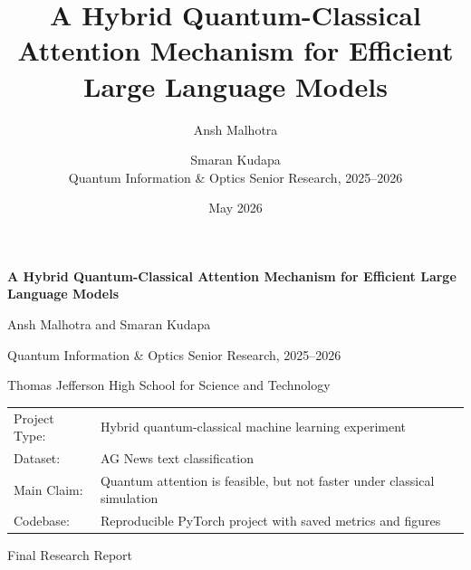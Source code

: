 \documentclass[11pt]{article}
\title{\textbf{A Hybrid Quantum-Classical Attention Mechanism for Efficient Large Language Models}}
\author{Ansh Malhotra \and Smaran Kudapa\\
Quantum Information \& Optics Senior Research, 2025--2026}
\date{May 2026}
\begin{document}
\begin{titlepage}
    \centering
    \vspace*{0.75in}
    {\Huge\bfseries A Hybrid Quantum-Classical Attention Mechanism for Efficient Large Language Models\par}
    \vspace{0.35in}
    {\Large Ansh Malhotra and Smaran Kudapa\par}
    \vspace{0.15in}
    {\large Quantum Information \& Optics Senior Research, 2025--2026\par}
    \vspace{0.4in}
    {\large Thomas Jefferson High School for Science and Technology\par}
    \vfill
    \begin{center}
    \begin{tabular}{ll}
        Project Type: & Hybrid quantum-classical machine learning experiment\\
        Dataset: & AG News text classification\\
        Main Claim: & Quantum attention is feasible, but not faster under classical simulation\\
        Codebase: & Reproducible PyTorch project with saved metrics and figures\\
    \end{tabular}
    \end{center}
    \vfill
    {\large Final Research Report\par}
\end{titlepage}
\end{document}
